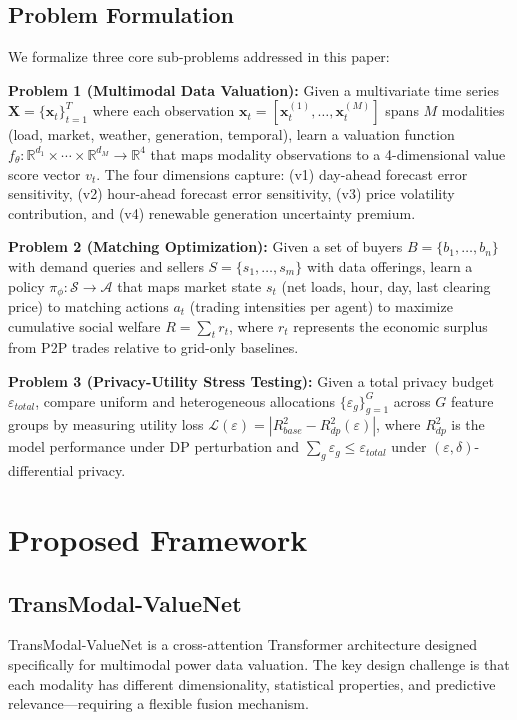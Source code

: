 \documentclass{ieeeaccess}
\begin{document}
\subsection{Problem Formulation}
We formalize three core sub-problems addressed in this paper:

\textbf{Problem 1 (Multimodal Data Valuation):} Given a multivariate time series $\mathbf{X} = \{\mathbf{x}_t\}_{t=1}^T$ where each observation $\mathbf{x}_t = [\mathbf{x}_t^{(1)}, \ldots, \mathbf{x}_t^{(M)}]$ spans $M$ modalities (load, market, weather, generation, temporal), learn a valuation function $f_{\theta}: \mathbb{R}^{d_1} \times \cdots \times \mathbb{R}^{d_M} \rightarrow \mathbb{R}^4$ that maps modality observations to a 4-dimensional value score vector $v_t$. The four dimensions capture: (v1) day-ahead forecast error sensitivity, (v2) hour-ahead forecast error sensitivity, (v3) price volatility contribution, and (v4) renewable generation uncertainty premium.

\textbf{Problem 2 (Matching Optimization):} Given a set of buyers $B = \{b_1, \ldots, b_n\}$ with demand queries and sellers $S = \{s_1, \ldots, s_m\}$ with data offerings, learn a policy $\pi_{\phi}: \mathcal{S} \rightarrow \mathcal{A}$ that maps market state $s_t$ (net loads, hour, day, last clearing price) to matching actions $a_t$ (trading intensities per agent) to maximize cumulative social welfare $R = \sum_{t} r_t$, where $r_t$ represents the economic surplus from P2P trades relative to grid-only baselines.

\textbf{Problem 3 (Privacy-Utility Stress Testing):} Given a total privacy budget $\varepsilon_{total}$, compare uniform and heterogeneous allocations $\{\varepsilon_g\}_{g=1}^G$ across $G$ feature groups by measuring utility loss $\mathcal{L}(\varepsilon) = |R^2_{base} - R^2_{dp}(\varepsilon)|$, where $R^2_{dp}$ is the model performance under DP perturbation and $\sum_g \varepsilon_g \leq \varepsilon_{total}$ under $(\varepsilon, \delta)$-differential privacy.

\section{Proposed Framework}
\label{sec:framework}

\subsection{TransModal-ValueNet}
\label{sec:transmodal}

TransModal-ValueNet is a cross-attention Transformer architecture designed specifically for multimodal power data valuation. The key design challenge is that each modality has different dimensionality, statistical properties, and predictive relevance---requiring a flexible fusion mechanism.
\end{document}
